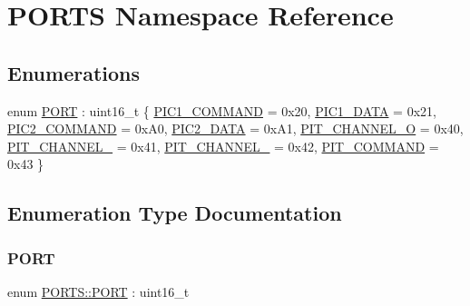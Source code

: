\hypertarget{namespace_p_o_r_t_s}{}\section{P\+O\+R\+TS Namespace Reference}
\label{namespace_p_o_r_t_s}
\subsection*{Enumerations}
\begin{DoxyCompactItemize}
\item 
enum \hyperlink{namespace_p_o_r_t_s_a3b339d41c00ec57c23181d1cbd61a250}{P\+O\+RT} \+: uint16\+\_\+t \{ \newline
\hyperlink{namespace_p_o_r_t_s_a3b339d41c00ec57c23181d1cbd61a250a72c7dd15a7ff560b20a6b3f3a9f68d9a}{P\+I\+C1\+\_\+\+C\+O\+M\+M\+A\+ND} = 0x20, 
\hyperlink{namespace_p_o_r_t_s_a3b339d41c00ec57c23181d1cbd61a250a10f9df06fbd3ef791e86a0863b504572}{P\+I\+C1\+\_\+\+D\+A\+TA} = 0x21, 
\hyperlink{namespace_p_o_r_t_s_a3b339d41c00ec57c23181d1cbd61a250a581e9432676d2b2a151cba95c026306b}{P\+I\+C2\+\_\+\+C\+O\+M\+M\+A\+ND} = 0x\+A0, 
\hyperlink{namespace_p_o_r_t_s_a3b339d41c00ec57c23181d1cbd61a250a7e8739064006357e9677502d3501a972}{P\+I\+C2\+\_\+\+D\+A\+TA} = 0x\+A1, 
\newline
\hyperlink{namespace_p_o_r_t_s_a3b339d41c00ec57c23181d1cbd61a250ac47b0edbbd3bc579790a906be54e170f}{P\+I\+T\+\_\+\+C\+H\+A\+N\+N\+E\+L\+\_\+O} = 0x40, 
\hyperlink{namespace_p_o_r_t_s_a3b339d41c00ec57c23181d1cbd61a250adb178e7d425e3d184e2ad167864e1ee1}{P\+I\+T\+\_\+\+C\+H\+A\+N\+N\+E\+L\+\_} = 0x41, 
\hyperlink{namespace_p_o_r_t_s_a3b339d41c00ec57c23181d1cbd61a250ad99d7d0a287fcc4fc4008407c4141e49}{P\+I\+T\+\_\+\+C\+H\+A\+N\+N\+E\+L\+\_} = 0x42, 
\hyperlink{namespace_p_o_r_t_s_a3b339d41c00ec57c23181d1cbd61a250ad22463f8106e61b4a255e546ca74735f}{P\+I\+T\+\_\+\+C\+O\+M\+M\+A\+ND} = 0x43
 \}
\end{DoxyCompactItemize}


\subsection{Enumeration Type Documentation}
\mbox{\label{namespace_p_o_r_t_s_a3b339d41c00ec57c23181d1cbd61a250}} 
\subsubsection{\texorpdfstring{P\+O\+RT}{PORT}}
{\footnotesize\ttfamily enum \hyperlink{namespace_p_o_r_t_s_a3b339d41c00ec57c23181d1cbd61a250}{P\+O\+R\+T\+S\+::\+P\+O\+RT} \+: uint16\+\_\+t}

